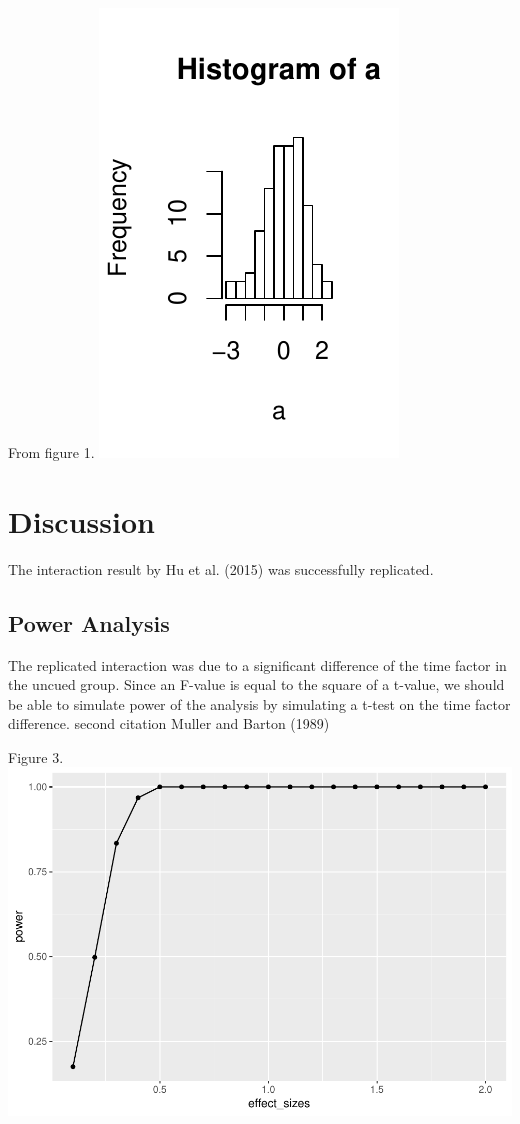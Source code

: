\documentclass[man,floatsintext]{apa6}
\begin{document}
From figure 1. \includegraphics{first_apa_files/figure-latex/fig1-1.pdf}

\section{Discussion}\label{discussion}

The interaction result by Hu et al. (2015) was successfully replicated.

\subsection{Power Analysis}\label{power-analysis}

The replicated interaction was due to a significant difference of the
time factor in the uncued group. Since an F-value is equal to the square
of a t-value, we should be able to simulate power of the analysis by
simulating a t-test on the time factor difference. second citation
Muller and Barton (1989)

Figure 3.
\includegraphics{first_apa_files/figure-latex/unnamed-chunk-5-1.pdf}
\end{document}
